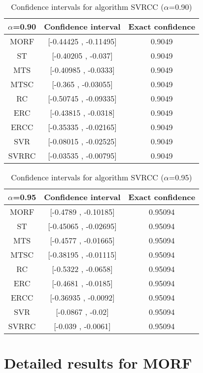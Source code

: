\documentclass[a4paper,10pt]{article}
\begin{document}
\begin{table}[!htp]
\centering\small
\begin{tabular}{
|c|c|c|}
\hline
 $\alpha$=0.90 & Confidence interval & Exact confidence \\ \hline 
MORF & [-0.44425 , -0.11495] & 0.9049\\ \hline 
ST & [-0.40205 , -0.037] & 0.9049\\ \hline 
MTS & [-0.40985 , -0.0333] & 0.9049\\ \hline 
MTSC & [-0.365 , -0.03055] & 0.9049\\ \hline 
RC & [-0.50745 , -0.09335] & 0.9049\\ \hline 
ERC & [-0.43815 , -0.0318] & 0.9049\\ \hline 
ERCC & [-0.35335 , -0.02165] & 0.9049\\ \hline 
SVR & [-0.08015 , -0.02525] & 0.9049\\ \hline 
SVRRC & [-0.03535 , -0.00795] & 0.9049\\ \hline 

\end{tabular}
\caption{Confidence intervals for algorithm SVRCC ($\alpha$=0.90)}
\end{table}
\begin{table}[!htp]
\centering\small
\begin{tabular}{
|c|c|c|}
\hline
 $\alpha$=0.95 & Confidence interval & Exact confidence \\ \hline 
MORF & [-0.4789 , -0.10185] & 0.95094\\ \hline 
ST & [-0.45065 , -0.02695] & 0.95094\\ \hline 
MTS & [-0.4577 , -0.01665] & 0.95094\\ \hline 
MTSC & [-0.38195 , -0.01115] & 0.95094\\ \hline 
RC & [-0.5322 , -0.0658] & 0.95094\\ \hline 
ERC & [-0.4681 , -0.0185] & 0.95094\\ \hline 
ERCC & [-0.36935 , -0.0092] & 0.95094\\ \hline 
SVR & [-0.0867 , -0.02] & 0.95094\\ \hline 
SVRRC & [-0.039 , -0.0061] & 0.95094\\ \hline 

\end{tabular}
\caption{Confidence intervals for algorithm SVRCC ($\alpha$=0.95)}
\end{table}

 \clearpage 


\section{Detailed results for MORF}
\end{document}
